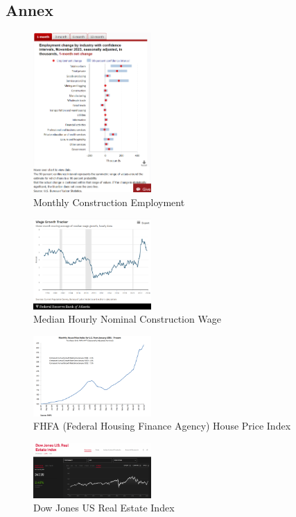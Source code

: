 \documentclass[
]{article}
\begin{document}
\hypertarget{annex}{%
\subsection{Annex}\label{annex}}

\begin{figure}
\hypertarget{fig:label}{%
\centering
\includegraphics[width=0.4\textwidth,height=0.4\textheight]{const_emp.png}
\caption{Monthly Construction Employment}\label{fig:label}
}
\end{figure}

\begin{figure}
\hypertarget{fig:label}{%
\centering
\includegraphics[width=0.4\textwidth,height=0.4\textheight]{const_wage.png}
\caption{Median Hourly Nominal Construction Wage}\label{fig:label}
}
\end{figure}

\begin{figure}
\hypertarget{fig:label}{%
\centering
\includegraphics[width=0.4\textwidth,height=0.4\textheight]{fhfa_9123.png}
\caption{FHFA (Federal Housing Finance Agency) House Price
Index}\label{fig:label}
}
\end{figure}

\begin{figure}
\hypertarget{fig:label}{%
\centering
\includegraphics[width=0.4\textwidth,height=0.4\textheight]{djusrei_1423.png}
\caption{Dow Jones US Real Estate Index}\label{fig:label}
}
\end{figure}
\end{document}
